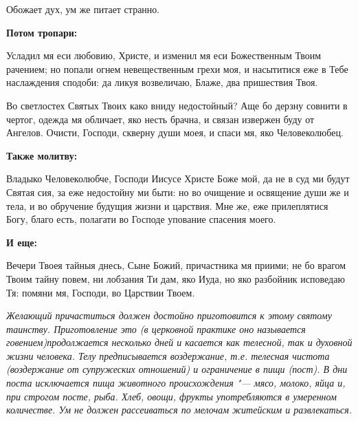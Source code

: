 Обожает дух, ум же питает странно.




\bfseries Потом тропари:\normalfont{}


Усладил мя еси любовию, Христе, и изменил мя еси Божественным Твоим рачением; но попали огнем невещественным грехи моя, и насытитися еже в Тебе наслаждения сподоби: да ликуя возвеличаю, Блаже, два пришествия Твоя.


Во светлостех Святых Твоих како вниду недостойный? Аще бо дерзну совнити в чертог, одежда мя обличает, яко несть брачна, и связан извержен буду от Ангелов. Очисти, Господи, скверну души моея, и спаси мя, яко Человеколюбец.




\bfseries Также молитву:\normalfont{}


Владыко Человеколюбче, Господи Иисусе Христе Боже мой, да не в суд ми будут Святая сия, за еже недостойну ми быти: но во очищение и освящение души же и тела, и во обручение будущия жизни и царствия. Мне же, еже прилеплятися Богу, благо есть, полагати во Господе упование спасения моего.




\bfseries И еще:\normalfont{}


Вечери Твоея тайныя днесь, Сыне Божий, причастника мя приими; не бо врагом Твоим тайну повем, ни лобзания Ти дам, яко Иуда, но яко разбойник исповедаю Тя: помяни мя, Господи, во Царствии Твоем.


\itshape Желающий причаститься должен достойно приготовится к этому святому таинству. Приготовление это (в церковной практике оно называется говением)продолжается несколько дней и касается как телесной, так и духовной жизни человека. Телу предписывается воздержание, т.е. телесная чистота (воздержание от супружеских отношений) и ограничение в пищи (пост). В дни поста исключается пища животного происхождения "--- мясо, молоко, яйца и, при строгом посте, рыба. Хлеб, овощи, фрукты употребляются в умеренном количестве. Ум не должен рассеиваться по мелочам житейским и развлекаться.\normalfont{}


